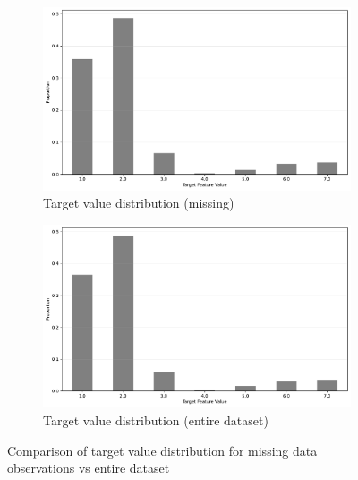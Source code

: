\documentclass[11pt]{article}
\begin{document}
\begin{figure}[H]
	\centering
	\begin{subfigure}[b]{0.48\textwidth}
		\centering
		\includegraphics[width=\textwidth]{images/target_feature_distribution_missing.pdf}
		\caption{Target value distribution (missing)}
		\label{fig:target_dist_missing}
	\end{subfigure}
	\hfill
	\begin{subfigure}[b]{0.48\textwidth}
		\centering
		\includegraphics[width=\textwidth]{images/target_feature_distribution_entire.pdf}
		\caption{Target value distribution (entire dataset)}
		\label{fig:target_dist_entire}
	\end{subfigure}
	\caption{Comparison of target value distribution for missing data observations vs entire dataset}
	\label{fig:target_dist}
\end{figure}
\end{document}
